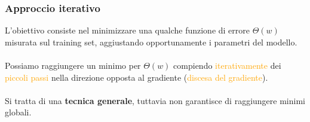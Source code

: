 \documentclass[a4paper,12pt]{article}
\newcommand{\hl}[1]{\textcolor{orange}{#1}}
\begin{document}
\subsubsection{Approccio iterativo}
L'obiettivo consiste nel minimizzare una qualche funzione di errore $\Theta(w)$ misurata sul training set, aggiustando opportunamente i parametri del modello.\\
\vspace{1px}\\
Possiamo raggiungere un minimo per $\Theta(w)$ compiendo \hl{iterativamente} dei \hl{piccoli passi} nella direzione opposta al gradiente (\hl{discesa del gradiente}).\\
\vspace{1px}\\
Si tratta di una \textbf{tecnica generale}, tuttavia non garantisce di raggiungere minimi globali.
\end{document}
